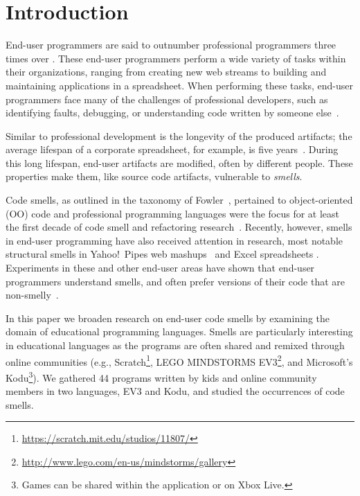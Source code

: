 \documentclass[conference]{IEEEtran}
\newcommand{\ms}{LEGO MINDSTORMS EV3}
\newcommand{\todo}[1]{\textbf{#1}}
\begin{document}
\section{Introduction}
End-user programmers are said to outnumber  professional programmers three times over \cite{Scaf2005}.
These end-user programmers perform a wide variety of tasks within their organizations, ranging from creating new web streams to building and maintaining applications in a spreadsheet. When performing these tasks, end-user programmers face many of the challenges of professional developers, such as identifying faults, debugging, or understanding code written by someone else~\cite{Ko2011}. 

Similar to professional development is the longevity of the produced artifacts; the average lifespan of a corporate spreadsheet, for example, is five years~\cite{Hermans2011}. During this long lifespan, end-user artifacts are modified, often by different people.
These properties make them, like source code artifacts, vulnerable to \emph{smells}. 

Code smells, as outlined in the taxonomy of Fowler~\cite{Fowl1999}, pertained to object-oriented (OO) code and professional programming languages were the focus for at least the first decade of code smell  and refactoring research~\cite{Mens:2004:SSR:972215.972286}. Recently, however, smells in end-user programming have also received attention in research, most notable structural smells in Yahoo!\ Pipes web mashups~\cite{Stolee2011} and Excel spreadsheets \cite{Hermans2012inter}. Experiments in these and other end-user areas have shown that end-user programmers understand smells, and often prefer versions of their code that are non-smelly~\cite{Hermans2012intra, StoleeTSE2013, chambers2013smell}.


In this paper we broaden research on end-user code smells by examining the domain of educational programming languages. Smells are particularly interesting in educational languages as the programs are often shared and remixed through online communities (e.g., Scratch\footnote{\url{https://scratch.mit.edu/studios/11807/}}, \ms\footnote{\url{http://www.lego.com/en-us/mindstorms/gallery}}, and Microsoft's Kodu\footnote{Games can be shared within the application or on Xbox Live.}). We gathered 44 programs written by kids and online community members in two languages, EV3 and  Kodu, and studied the occurrences of code smells.
\end{document}

